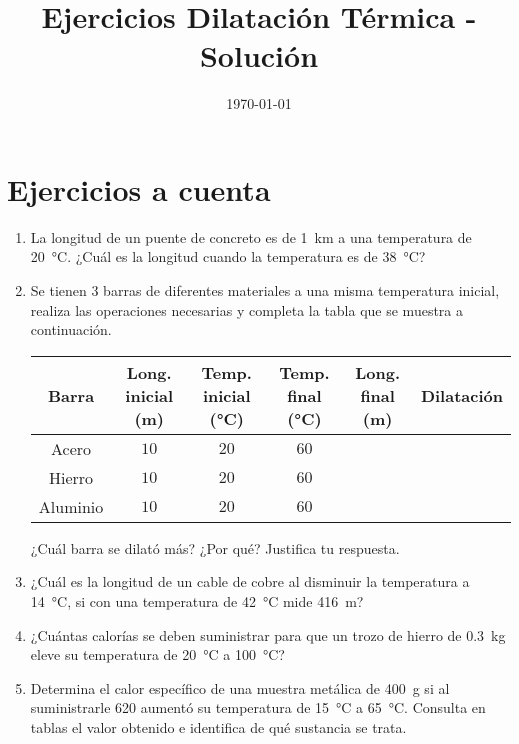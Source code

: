 \documentclass[14pt]{extarticle}
\title{\vspace*{-2cm} Ejercicios Dilatación Térmica - Solución\vspace{-5ex}}
\date{\today}
\begin{document}
\maketitle

\section{Ejercicios a cuenta}

\begin{enumerate}
\item La longitud de un puente de concreto es de \SI{1}{\kilo\meter} a una temperatura de \SI{20}{\degreeCelsius}. ¿Cuál es la longitud cuando la temperatura es de \SI{38}{\degreeCelsius}?
\item Se tienen 3 barras de diferentes materiales a una misma temperatura inicial, realiza las operaciones necesarias y completa la tabla que se muestra a continuación.
\begin{table}[H]
\centering
\begin{tabular}{c | c | c | c | c | c}
Barra & \makecell{Long. inicial \\ (\unit{\meter})} & \makecell{Temp. inicial \\ (\unit{\degreeCelsius})} & \makecell{Temp. final \\ (\unit{\degreeCelsius})} & \makecell{Long. final \\ (\unit{\meter})} & Dilatación \\ \hline
Acero & $10$ & $20$ & $60$ & & \\ \hline
Hierro & $10$ & $20$ & $60$ & & \\ \hline
Aluminio & $10$ & $20$ & $60$ & & \\ \hline    
\end{tabular}
\end{table}
¿Cuál barra se dilató más? ¿Por qué? Justifica tu respuesta.
\item ¿Cuál es la longitud de un cable de cobre al disminuir la temperatura a \SI{14}{\degreeCelsius}, si con una temperatura de \SI{42}{\degreeCelsius} mide \SI{416}{\meter}?
\item ¿Cuántas calorías se deben suministrar para que un trozo de hierro de \SI{0.3}{\kilo\gram} eleve su temperatura de \SI{20}{\degreeCelsius} a \SI{100}{\degreeCelsius}?
\item Determina el calor específico de una muestra metálica de \SI{400}{\gram} si al suministrarle \SI{620}{\cal} aumentó su temperatura de \SI{15}{\degreeCelsius} a \SI{65}{\degreeCelsius}. Consulta en tablas el valor obtenido e identifica de qué sustancia se trata.
\end{enumerate}
\end{document}
